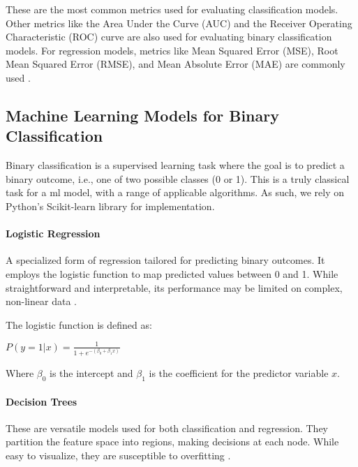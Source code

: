        These are the most common metrics used for evaluating classification models. Other metrics like the Area Under the Curve (AUC) and the Receiver Operating Characteristic (ROC) curve are also used for evaluating binary classification models. For regression models, metrics like Mean Squared Error (MSE), Root Mean Squared Error (RMSE), and Mean Absolute Error (MAE) are commonly used \cite{ScikitLearn}.

        \subsection{Machine Learning Models for Binary Classification}
        Binary classification is a supervised learning task where the goal is to predict a binary outcome, i.e., one of two possible classes (0 or 1). This is a truly classical task for a \acrshort{ml} model, with a range of applicable algorithms. As such, we rely on Python's Scikit-learn library for implementation.

        \paragraph{Logistic Regression}
        A specialized form of regression tailored for predicting binary outcomes. It employs the logistic function to map predicted values between 0 and 1. While straightforward and interpretable, its performance may be limited on complex, non-linear data \cite{nick_logistic_2007}.

        \begin{minipage}{\dimexpr\linewidth-20pt}
            The logistic function is defined as:
            \par
            \vspace{2em}
            \begin{center}
                $
                P(y=1|x) = \frac{1}{1 + e^{-(\beta_0 + \beta_1 x)}}
                $
            \end{center}
            \vspace{1em}
            Where \( \beta_0 \) is the intercept and \( \beta_1 \) is the coefficient for the predictor variable \( x \).
        \end{minipage}

        \paragraph{Decision Trees}
        These are versatile models used for both classification and regression. They partition the feature space into regions, making decisions at each node. While easy to visualize, they are susceptible to overfitting \cite{kotsiantis_decision_2013}.

